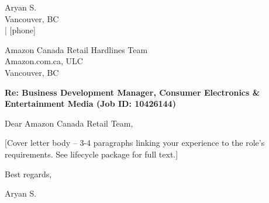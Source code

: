 \documentclass[11pt,letterpaper]{article}
\begin{document}
\begin{flushleft}
Aryan S. \\
Vancouver, BC \\
[email] | [phone]
\end{flushleft}

\vspace{12pt}

\begin{flushleft}
[Date]
\end{flushleft}

\vspace{12pt}

\begin{flushleft}
Amazon Canada Retail Hardlines Team \\
Amazon.com.ca, ULC \\
Vancouver, BC
\end{flushleft}

\vspace{12pt}

\textbf{Re: Business Development Manager, Consumer Electronics \& Entertainment Media (Job ID: 10426144)}

\vspace{12pt}

Dear Amazon Canada Retail Team,

[Cover letter body -- 3-4 paragraphs linking your experience to the role's requirements. See lifecycle package for full text.]

Best regards,

\vspace{6pt}

Aryan S.
\end{document}
